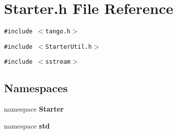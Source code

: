 \section{Starter.h File Reference}
\label{Starter_8h}
{\tt \#include $<$tango.h$>$}\par
{\tt \#include $<$Starter\-Util.h$>$}\par
{\tt \#include $<$sstream$>$}\par
\subsection*{Namespaces}
\begin{CompactItemize}
\item 
namespace {\bf Starter}
\item 
namespace {\bf std}
\end{CompactItemize}

